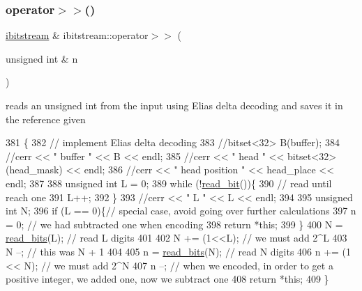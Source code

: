 \subsubsection{\texorpdfstring{operator$>$$>$()}{operator>>()}\hspace{0.1cm}{\footnotesize\ttfamily [1/2]}}
{\footnotesize\ttfamily \hyperlink{classibitstream}{ibitstream} \& ibitstream\+::operator$>$$>$ (\begin{DoxyParamCaption}\item[{unsigned int \&}]{n }\end{DoxyParamCaption})}



reads an unsigned int from the input using Elias delta decoding and saves it in the reference given 


\begin{DoxyCode}
381                                                    \{
382   \textcolor{comment}{// implement Elias delta decoding}
383   \textcolor{comment}{//bitset<32> B(buffer);}
384   \textcolor{comment}{//cerr << " buffer " << B << endl;}
385   \textcolor{comment}{//cerr << " head " << bitset<32>(head\_mask) << endl;}
386   \textcolor{comment}{//cerr << " head position " << head\_place << endl;}
387   
388   \textcolor{keywordtype}{unsigned} \textcolor{keywordtype}{int} L = 0;
389   \textcolor{keywordflow}{while} (!\hyperlink{classibitstream_a895239acf7179f6778388c39c97643e4}{read\_bit}())\{
390     \textcolor{comment}{// read until reach one}
391     L++;
392   \}
393   \textcolor{comment}{//cerr << " L " << L << endl;}
394   
395   \textcolor{keywordtype}{unsigned} \textcolor{keywordtype}{int} N;
396   \textcolor{keywordflow}{if} (L == 0)\{\textcolor{comment}{// special case, avoid going over further calculations}
397     n = 0; \textcolor{comment}{// we had subtracted one when encoding }
398     \textcolor{keywordflow}{return} *\textcolor{keyword}{this};
399   \}
400   N = \hyperlink{classibitstream_a2fdcaecf10fefa6942dcd5286a2696e0}{read\_bits}(L); \textcolor{comment}{// read L digits}
401   
402   N += (1<<L); \textcolor{comment}{// we must add 2^L}
403   N --; \textcolor{comment}{// this was N + 1}
404   
405   n = \hyperlink{classibitstream_a2fdcaecf10fefa6942dcd5286a2696e0}{read\_bits}(N); \textcolor{comment}{// read N digits}
406   n += (1 << N); \textcolor{comment}{// we must add 2^N}
407   n --; \textcolor{comment}{// when we encoded, in order to get a positive integer, we added one, now we subtract one}
408   \textcolor{keywordflow}{return} *\textcolor{keyword}{this};
409 \}
\end{DoxyCode}
\mbox{\label{classibitstream_a0264d01fa1211c4bb73f5de2bc68adbc}} 
